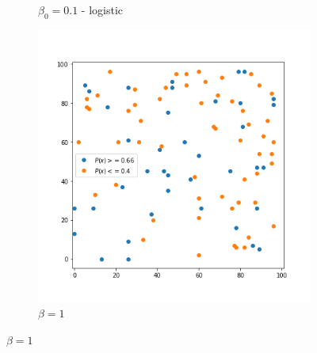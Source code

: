 \begin{figure}[!ht]
\begin{subfigure}{.3\textwidth}
	    \caption{$\beta_0=0.1$ - logistic}
	    \label{fig:meine-grafik}
    \end{subfigure}%
	\begin{subfigure}{.3\textwidth}
    	\centering
    	\includegraphics[width=1\linewidth]{Bilder/simulation_4_3}
    	\caption{$\beta=1$}
    	\label{fig:meine-grafik}
	\end{subfigure}
\end{figure}

